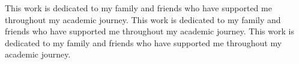 


   \noindent
   This work is dedicated to my family and friends who have supported me throughout my academic journey. This work is dedicated to my family and friends who have supported me throughout my academic journey. This work is dedicated to my family and friends who have supported me throughout my academic journey.
